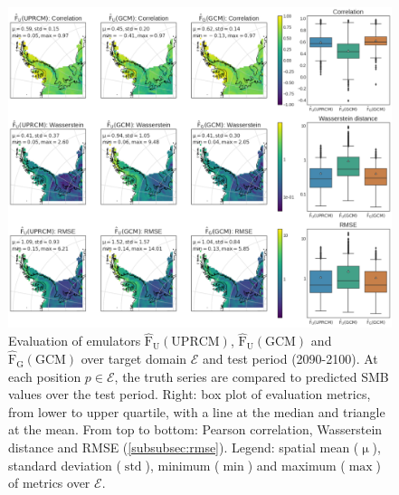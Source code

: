 \documentclass[a4paper,11pt,oneside]{report}
\begin{document}
\begin{figure}[!ht]
  \centering
  \includegraphics[width=\columnwidth]{doc/Thesis-latex/images/results/metrics_RCM_GCM.pdf}
  \caption []{\small Evaluation of emulators $\mathrm{\hat{F}_{U}(UPRCM)}$,  $\mathrm{\hat{F}_{U}(GCM)}$ and $\mathrm{\hat{F}_{G}(GCM)}$ over target domain $\mathcal{E}$ and test period (2090-2100). At each position $p \in\mathcal{E}$, the truth series are compared to predicted SMB values over the test period. Right: box plot of evaluation metrics, from lower to upper quartile, with a line at the median and triangle at the mean. From top to bottom: Pearson correlation, Wasserstein distance and RMSE (\autoref{subsubsec:rmse}). Legend: spatial mean ($\operatorname{\mu}$), standard deviation ($\operatorname{std}$), minimum ($\min$) and maximum ($\max$) of metrics over $\mathcal{E}$.}
  \vspace{-3mm}
  \label{fig:evaluation-GCM-RCM}
\end{figure}
\end{document}
